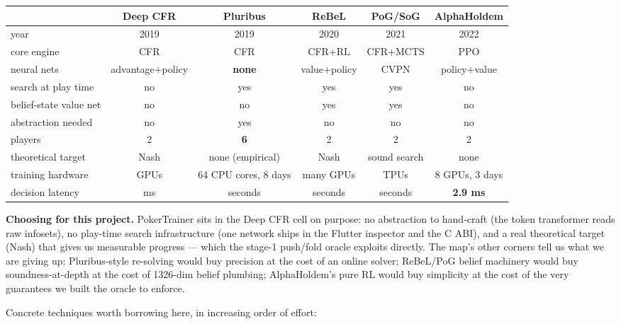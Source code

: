 \documentclass[11pt,a4paper]{article}
\begin{document}
\begin{center}
\small
\begin{tabular}{@{}lccccc@{}}
\toprule
 & Deep CFR & Pluribus & ReBeL & PoG/SoG & AlphaHoldem \\
\midrule
year                 & 2019 & 2019 & 2020 & 2021 & 2022 \\
core engine          & CFR  & CFR  & CFR+RL & CFR+MCTS & PPO \\
neural nets          & advantage+policy & \textbf{none} & value+policy & CVPN & policy+value \\
search at play time  & no   & yes  & yes  & yes  & no \\
belief-state value net & no   & no   & yes  & yes  & no \\
abstraction needed   & no   & yes  & no   & no   & no \\
players              & 2    & \textbf{6} & 2 & 2 & 2 \\
theoretical target   & Nash & none (empirical) & Nash & sound search & none \\
training hardware    & GPUs & 64 CPU cores, 8 days & many GPUs & TPUs & 8 GPUs, 3 days \\
decision latency     & ms   & seconds & seconds & seconds & \textbf{2.9 ms} \\
\bottomrule
\end{tabular}
\end{center}

\begin{intuition}
\textbf{Choosing for this project.} PokerTrainer sits in the Deep CFR cell on
purpose: no abstraction to hand-craft (the token transformer reads raw
infosets), no play-time search infrastructure (one network ships in the
Flutter inspector and the C ABI), and a real theoretical target (Nash) that
gives us measurable progress --- which the stage-1 push/fold oracle exploits
directly. The map's other corners tell us what we are giving up: Pluribus-style
re-solving would buy precision at the cost of an online solver; ReBeL/PoG
belief machinery would buy soundness-at-depth at the cost of 1326-dim belief
plumbing; AlphaHoldem's pure RL would buy simplicity at the cost of the very
guarantees we built the oracle to enforce.
\end{intuition}

Concrete techniques worth borrowing here, in increasing order of effort:
\end{document}

